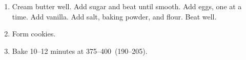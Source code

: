 
\begin{ingredients}
\end{ingredients}


\begin{recipe}
  \begin{enumerate}
  \item Cream butter well.  Add sugar and beat until smooth.
    Add eggs, one at a time.  Add vanilla.  Add salt, baking powder,
    and flour.  Beat well.

  \item Form cookies.

  \item Bake 10--12 minutes at 375--400\F\ (190--205\C).

  \end{enumerate}
\end{recipe}

